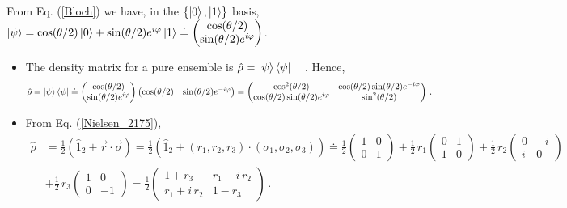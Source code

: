 \documentclass[11pt]{article}
\numberwithin{equation}{section} %
\numberwithin{figure}{section} %
\begin{document}
\begin{appendices}
\vspace{1cm}
\subsection{} \label{proof_Nielsen_2175}

From Eq. (\ref{Bloch}) we have, in the $\{\ket{0},\ket{1}\}$ basis, $\ket{\psi}=\cos(\theta/2)\ket{0}+\sin(\theta/2)e^{i\varphi}\ket{1}\doteq\begin{pmatrix}\cos(\theta/2)\\\sin(\theta/2)e^{i\varphi}\end{pmatrix}$.\\

\begin{itemize}
\item The density matrix for a pure ensemble is $\hat{\rho}=\ket{\psi}\bra{\psi}$  $\,\,\,$ \cite[p.~182, Eq.~(3.4.12)]{Sakurai}. Hence, 
\begin{equation} \label{C1}
\hat{\rho}=\ket{\psi}\bra{\psi}\doteq\begin{pmatrix}\cos(\theta/2)\\\sin(\theta/2)e^{i\varphi}\end{pmatrix}\begin{pmatrix}\cos(\theta/2)&\sin(\theta/2)e^{-i\varphi}\end{pmatrix}=\begin{pmatrix}\cos^2(\theta/2)&\cos(\theta/2)\sin(\theta/2)e^{-i\varphi}\\ \cos(\theta/2)\sin(\theta/2)e^{i\varphi}&\sin^2(\theta/2)\end{pmatrix}\,\textrm{.}
\end{equation}
\item From Eq. (\ref{Nielsen_2175}), 
\begin{equation} \label{C2}
\begin{split}
\hat{\rho}
&=\frac{1}{2}(\hat{1}_2+\vec{r}\cdot\vec{\sigma})=\frac{1}{2}(\hat{1}_2+(r_1,r_2,r_3)\cdot(\sigma_1,\sigma_2,\sigma_3))\doteq\frac{1}{2}\begin{pmatrix}1&0\\0&1\end{pmatrix}+\frac{1}{2}\,r_1\begin{pmatrix}0&1\\1&0\end{pmatrix}+\frac{1}{2}\,r_2\begin{pmatrix}0&-i\\i&0\end{pmatrix}\\
&+\frac{1}{2}\,r_3\begin{pmatrix}1&0\\0&-1\end{pmatrix}=\frac{1}{2}\begin{pmatrix}
1+r_3 & r_1-i\,r_2\\r_1+i\,r_2 & 1-r_3
\end{pmatrix}\,\textrm{.}
\end{split}
\end{equation}
\end{itemize}


\end{appendices}
\end{document}
